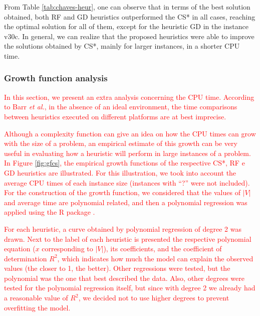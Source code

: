 \documentclass{ro}
\begin{document}
From Table \ref{tab:chaves-heur}, one can observe that in terms of the best solution obtained,  both RF and GD heuristics outperformed the CS* in all cases, reaching the optimal solution for all of them, except for the heuristic GD in the instance v30c. In general, we can realize that the proposed heuristics were able to improve the solutions obtained by CS*, mainly for  larger instances, in a shorter CPU time.


\subsubsection{Growth function analysis}

\textcolor{red}{In this section, we present an extra analysis concerning the CPU time. According to Barr \textit{et al.}\cite{barr2001guidelines}, in the absence of an ideal environment, the time comparisons between heuristics executed on different platforms are at best imprecise.}

\textcolor{red}{
Although a complexity function can give an idea on how the CPU times can grow with the size of a problem, an empirical estimate of this growth can be very useful in evaluating how a heuristic will perform in large instances of a problem. In Figure \ref{fig:gfcs}, the empirical growth functions of the respective CS*, RF e GD heuristics are illustrated. For this illustration, we took into account the average CPU times of each instance size (instances with ``?'' were not included). For the construction of the growth function, we considered that the values of $|V|$ and average time are polynomial related, and then a polynomial regression was applied using the R package \cite{r-package}.}

\textcolor{red}{
For each heuristic, a curve obtained by polynomial regression of degree 2 was drawn. Next to the label of each heuristic is presented the respective polynomial equation ($x$ corresponding to $|V|$), its coefficients, and the coefficient of determination $R^2$, which indicates how much the model can explain the observed values (the closer to 1, the better). Other regressions were tested, but the polynomial was the one that best described the data. Also, other degrees were tested for the polynomial regression itself, but since with degree 2 we already had a reasonable value of $R^2$, we decided not to use higher degrees to prevent overfitting the model.}
\end{document}
